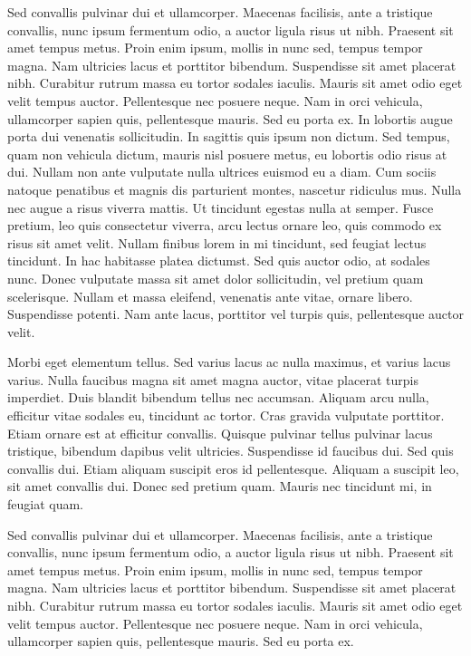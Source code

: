 Sed convallis pulvinar dui et ullamcorper. Maecenas facilisis, ante a tristique convallis, nunc ipsum fermentum odio, a auctor ligula risus ut nibh. Praesent sit amet tempus metus. Proin enim ipsum, mollis in nunc sed, tempus tempor magna. Nam ultricies lacus et porttitor bibendum. Suspendisse sit amet placerat nibh. Curabitur rutrum massa eu tortor sodales iaculis. Mauris sit amet odio eget velit tempus auctor. Pellentesque nec posuere neque. Nam in orci vehicula, ullamcorper sapien quis, pellentesque mauris. Sed eu porta ex. 
In lobortis augue porta dui venenatis sollicitudin. In sagittis quis ipsum non dictum. Sed tempus, quam non vehicula dictum, mauris nisl posuere metus, eu lobortis odio risus at dui. Nullam non ante vulputate nulla ultrices euismod eu a diam. Cum sociis natoque penatibus et magnis dis parturient montes, nascetur ridiculus mus. Nulla nec augue a risus viverra mattis. Ut tincidunt egestas nulla at semper. Fusce pretium, leo quis consectetur viverra, arcu lectus ornare leo, quis commodo ex risus sit amet velit. Nullam finibus lorem in mi tincidunt, sed feugiat lectus tincidunt. In hac habitasse platea dictumst. Sed quis auctor odio, at sodales nunc. Donec vulputate massa sit amet dolor sollicitudin, vel pretium quam scelerisque. Nullam et massa eleifend, venenatis ante vitae, ornare libero. Suspendisse potenti. Nam ante lacus, porttitor vel turpis quis, pellentesque auctor velit.

Morbi eget elementum tellus. Sed varius lacus ac nulla maximus, et varius lacus varius. Nulla faucibus magna sit amet magna auctor, vitae placerat turpis imperdiet. Duis blandit bibendum tellus nec accumsan. Aliquam arcu nulla, efficitur vitae sodales eu, tincidunt ac tortor. Cras gravida vulputate porttitor. Etiam ornare est at efficitur convallis. Quisque pulvinar tellus pulvinar lacus tristique, bibendum dapibus velit ultricies. Suspendisse id faucibus dui. Sed quis convallis dui. Etiam aliquam suscipit eros id pellentesque. Aliquam a suscipit leo, sit amet convallis dui. Donec sed pretium quam. Mauris nec tincidunt mi, in feugiat quam.

Sed convallis pulvinar dui et ullamcorper. Maecenas facilisis, ante a tristique convallis, nunc ipsum fermentum odio, a auctor ligula risus ut nibh. Praesent sit amet tempus metus. Proin enim ipsum, mollis in nunc sed, tempus tempor magna. Nam ultricies lacus et porttitor bibendum. Suspendisse sit amet placerat nibh. Curabitur rutrum massa eu tortor sodales iaculis. Mauris sit amet odio eget velit tempus auctor. Pellentesque nec posuere neque. Nam in orci vehicula, ullamcorper sapien quis, pellentesque mauris. Sed eu porta ex. 

